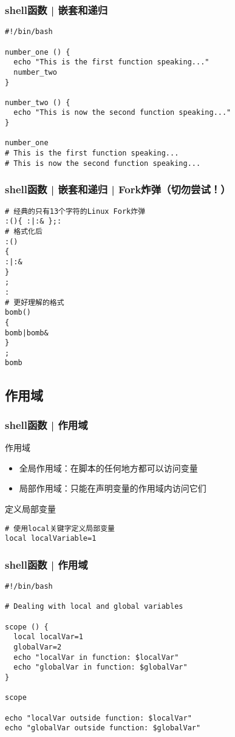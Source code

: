 \begin{frame}[fragile]
  \frametitle{shell函数 | 嵌套和递归}
  \vspace{-0.5em}
\begin{lstlisting}
#!/bin/bash

number_one () {
  echo "This is the first function speaking..."
  number_two
}

number_two () {
  echo "This is now the second function speaking..."
}

number_one
# This is the first function speaking...
# This is now the second function speaking...
\end{lstlisting}
\end{frame}

\begin{frame}[fragile]
  \frametitle{shell函数 | 嵌套和递归 | Fork炸弹（\alert{切勿尝试！}）}
  \vspace{-0.5em}
\begin{lstlisting}
# 经典的只有13个字符的Linux Fork炸弹
:(){ :|:& };:
# 格式化后
:()
{
:|:&
}
;
:
# 更好理解的格式
bomb()
{
bomb|bomb&
}
;
bomb
\end{lstlisting}
\end{frame}

\subsection{作用域}
\begin{frame}[fragile]
  \frametitle{shell函数 | \alert{作用域}}
  \begin{block}{作用域}
    \begin{itemize}
      \item 全局作用域：在脚本的任何地方都可以访问变量
      \item 局部作用域：只能在声明变量的作用域内访问它们
    \end{itemize}
  \end{block}
  \begin{block}{定义局部变量}
\begin{lstlisting}
# 使用local关键字定义局部变量
local localVariable=1
\end{lstlisting}
  \end{block}
\end{frame}

\begin{frame}[fragile]
  \frametitle{shell函数 | 作用域}
\begin{lstlisting}
#!/bin/bash

# Dealing with local and global variables

scope () {
  local localVar=1
  globalVar=2
  echo "localVar in function: $localVar"
  echo "globalVar in function: $globalVar"
}

scope

echo "localVar outside function: $localVar"
echo "globalVar outside function: $globalVar"
\end{lstlisting}
\end{frame}


